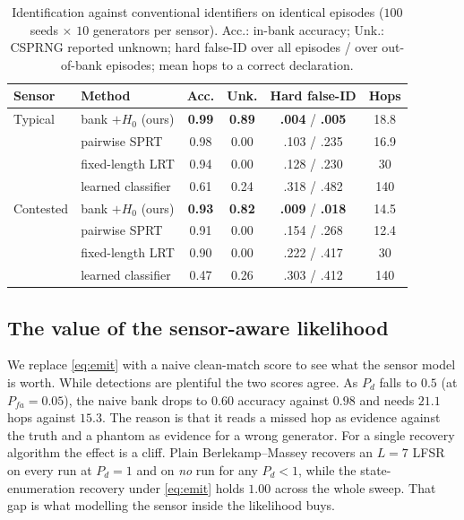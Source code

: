 \documentclass[conference]{IEEEtran}
\begin{document}
\begin{table}[t]
\centering
\caption{Identification against conventional identifiers on identical episodes
($100$ seeds $\times$ $10$ generators per sensor). Acc.: in-bank accuracy;
Unk.: CSPRNG reported unknown; hard false-ID over all episodes / over
out-of-bank episodes; mean hops to a correct declaration.}
\label{tab:idbase}
\setlength{\tabcolsep}{3.2pt}
\footnotesize
\begin{tabular}{@{}llcccc@{}}
\toprule
Sensor & Method & Acc. & Unk. & Hard false-ID & Hops \\
\midrule
Typical   & bank $+H_0$ (ours) & \textbf{0.99} & \textbf{0.89} & \textbf{.004} / \textbf{.005} & 18.8 \\
          & pairwise SPRT      & 0.98 & 0.00 & .103 / .235 & 16.9 \\
          & fixed-length LRT   & 0.94 & 0.00 & .128 / .230 & 30 \\
          & learned classifier & 0.61 & 0.24 & .318 / .482 & 140 \\
\midrule
Contested & bank $+H_0$ (ours) & \textbf{0.93} & \textbf{0.82} & \textbf{.009} / \textbf{.018} & 14.5 \\
          & pairwise SPRT      & 0.91 & 0.00 & .154 / .268 & 12.4 \\
          & fixed-length LRT   & 0.90 & 0.00 & .222 / .417 & 30 \\
          & learned classifier & 0.47 & 0.26 & .303 / .412 & 140 \\
\bottomrule
\end{tabular}
\end{table}

\subsection{The value of the sensor-aware likelihood}
We replace \eqref{eq:emit} with a naive clean-match score to see what the
sensor model is worth. While detections are plentiful the two scores agree. As
$P_d$ falls to $0.5$ (at $P_{fa}=0.05$), the naive bank drops to $0.60$
accuracy against $0.98$ and needs $21.1$ hops against $15.3$. The reason is
that it reads a missed hop as evidence against the truth and a phantom as
evidence for a wrong generator. For a single recovery algorithm the effect is a
cliff. Plain Berlekamp--Massey recovers an $L{=}7$ LFSR on every run at
$P_d{=}1$ and on \emph{no} run for any $P_d<1$, while the state-enumeration
recovery under \eqref{eq:emit} holds $1.00$ across the whole sweep. That gap is
what modelling the sensor inside the likelihood buys.
\end{document}
